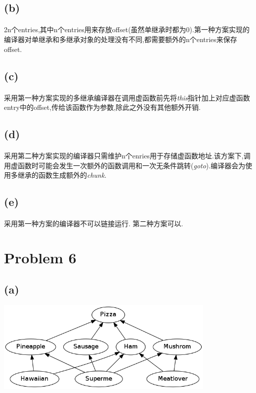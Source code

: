 \documentclass[A4paper,10pt]{paper}
\begin{document}
	\subsection*{(b)}
	\paragraph{} 2n个entries,其中n个entries用来存放offset(虽然单继承时都为0).第一种方案实现的编译器对单继承和多继承对象的处理没有不同,都需要额外的n个entries来保存offset.
	
	\subsection*{(c)}
	\paragraph{} 采用第一种方案实现的多继承编译器在调用虚函数前先将\emph{this}指针加上对应虚函数entry中的offset,传给该函数作为参数,除此之外没有其他额外开销.
	
	\subsection*{(d)}
	\paragraph{} 采用第二种方案实现的编译器只需维护n个enries用于存储虚函数地址.该方案下,调用虚函数时可能会发生一次额外的函数调用和一次无条件跳转(\emph{goto}).编译器会为使用多继承的函数生成额外的\emph{chunk}.
	
	\subsection*{(e)}
	\paragraph{} 采用第一种方案的编译器不可以链接运行. 第二种方案可以.
	
\section*{Problem 6}
	\subsection*{(a)}
	\includegraphics[width=0.8\textwidth]{./pro6.png}
\end{document}
